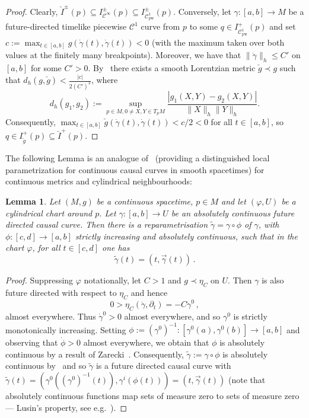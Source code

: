 \documentclass[reqno]{amsart}
\numberwithin{equation}{section}
\theoremstyle{plain}
\newtheorem{lemma}[theorem]{Lemma}
\theoremstyle{definition}
\theoremstyle{remark}
\newcommand{\copw}{\mathcal{C}^1_{\mathrm{pw}}}
\newcommand{\vphi}{\varphi}
\newcommand{\cinfty}{\mathcal{C}^\infty}
\newcommand{\sse}{\subseteq}
\begin{document}
\begin{proof}
Clearly, $\check I^\pm(p) \sse I^\pm_{\cinfty}(p) \sse I^\pm_{\copw}(p)$. Conversely, let 
$\gamma \colon [a,b] \to M$ be a future-directed timelike piecewise $\mathcal{C}^1$ curve from $p$ to 
some $q\in I^+_{\copw}(p)$ and set $c:= \max_{t\in [a,b]}g(\dot \gamma(t),\dot \gamma(t))<0$
(with the maximum taken over both values at the finitely many breakpoints). Moreover, we have that $\| \dot\gamma \|_h \leq C'$ on 
$[a,b]$ for some $C'>0$. By~\cite[Prop.\ 1.2]{CG:12} there exists a smooth Lorentzian metric $\check g \prec g$ such that
$d_h(g,\check{g})<\frac{|c|}{2 (C')^2}$, where
\begin{equation}
d_h(g_1,g_2) := \sup_{p\in M,0\not=X,Y\in T_pM} \frac{|g_1(X,Y)-g_2(X,Y)|}{\|X\|_h 	\|Y\|_h}.
\end{equation}
Consequently, $\max_{t\in [a,b]}\check g(\dot \gamma(t),\dot \gamma(t))<c/2<0$ for all $t\in [a,b]$,
so $q\in I_{\check{g}}^+(p)\sse \check I^+(p)$.
\end{proof}


The following Lemma is an analogue of~\cite[Lem.\ 3.2.1]{Kri:99} (providing a distinguished local parametrization for
continuous causal curves in smooth spacetimes) for continuous metrics and cylindrical neighbourhoods:
\begin{lemma}\label{lem-ac-nic-par} 
 Let $(M,g)$ be a continuous spacetime, $p\in M$ and let $(\vphi,U)$ be a cylindrical chart around $p$. Let 
$\gamma\colon[a,b]\rightarrow U$ be an absolutely continuous future directed causal curve. Then there is a reparametrisation 
$\tilde\gamma=\gamma\circ\phi$ of $\gamma$, with $\phi\colon[c,d]\rightarrow[a,b]$ strictly increasing and absolutely 
continuous, such that in the chart $\vphi$, for all $t\in[c,d]$ one has
\begin{equation}
 \tilde\gamma(t) = (t,\vec{\gamma}(t))\,.
\end{equation}
\end{lemma}
\begin{proof}
Suppressing $\vphi$ notationally, let $C>1$ and $g \prec \eta_C$ on $U$. 
Then $\gamma$ is also future directed with respect to $\eta_C$ and hence
 \begin{equation}
  0>\eta_C(\dot\gamma,\partial_t) = -C\dot\gamma^0\,,
 \end{equation}
almost everywhere. Thus $\dot\gamma^0>0$ almost everywhere, and so $\gamma^0$ is strictly monotonically increasing. Setting 
$\phi:=(\gamma^0)^{-1}\colon [\gamma^0(a),\gamma^0(b)]\rightarrow [a,b]$ and observing that $\dot\phi>0$ almost everywhere, 
we obtain that $\phi$ is absolutely continuous by a result of Zarecki~\cite[p.\ 271]{Nat:55}. Consequently, 
$\tilde\gamma:=\gamma\circ\phi$ is absolutely continuous by~\cite[Thm.\ 3, Ch.\ IX, \S 1]{Nat:55} and so $\tilde\gamma$ is a 
future directed causal curve with $\tilde\gamma(t)=(\gamma^0((\gamma^0)^{-1}(t)),\gamma^i(\phi(t))) = (t, \vec\gamma(t))$ 
(note that absolutely continuous functions map sets of measure zero to sets of measure zero --- Lusin's property, see e.g.\ 
\cite[Thm.\ 3.4.3]{AT:04}).
\end{proof}
\end{document}
